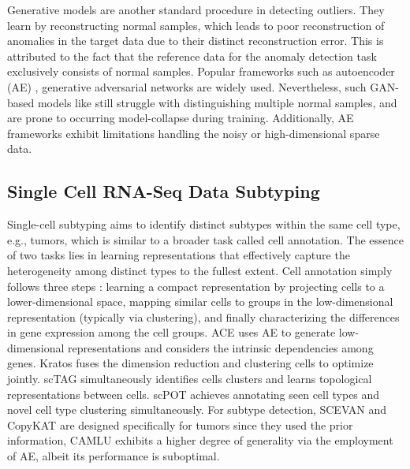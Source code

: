 \documentclass{article}
\begin{document}
Generative models are another standard procedure in detecting outliers. They learn by 
reconstructing normal samples, which leads to poor reconstruction of anomalies in 
the target data due to their distinct reconstruction error. This is attributed to the 
fact that the reference data for the anomaly detection task exclusively consists of 
normal samples.
Popular frameworks such as autoencoder (AE) \cite{odae}, generative adversarial 
networks \cite{GANad} are widely used. Nevertheless, such GAN-based 
models like \cite{EffGAN} still struggle with distinguishing multiple normal samples, and are prone to 
occurring model-collapse during training. Additionally, AE frameworks exhibit limitations 
handling the noisy or high-dimensional sparse data.
\subsection{Single Cell RNA-Seq Data Subtyping}
Single-cell subtyping aims to identify distinct subtypes within the same cell type, e.g., 
tumors, which is similar to a broader task called cell annotation. The essence of two 
tasks lies in learning representations that effectively capture the heterogeneity among 
distinct types to the fullest extent. Cell annotation simply follows three 
steps \cite{threestep}: learning a compact representation by projecting cells to a 
lower-dimensional space, mapping similar cells to groups in the low-dimensional 
representation (typically via clustering), and finally characterizing the differences in 
gene expression among the cell groups. ACE \cite{ACE} uses AE to generate 
low-dimensional representations and considers the intrinsic dependencies among genes. 
Kratos \cite{kratos} fuses the dimension reduction and clustering cells to 
optimize jointly. scTAG \cite{scTAG} simultaneously identifies cells clusters and 
learns topological representations between cells. scPOT \cite{scPOT} achieves 
annotating seen cell types and novel cell type clustering simultaneously. For subtype 
detection, SCEVAN \cite{SCEVAN} and CopyKAT \cite{CopyKAT} are designed 
specifically for tumors since they used the prior information, CAMLU \cite{CAMLU} 
exhibits a higher degree of generality via the employment of AE, albeit its performance is suboptimal. 
\end{document}
